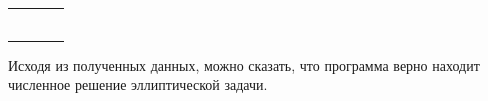 \begin{table}
\begin{tabularx}{1.0\textwidth}{| >{\raggedright\arraybackslash}X | >{\raggedright\arraybackslash}X | >{\raggedright\arraybackslash}X |>{\raggedright\arraybackslash}X |}
		\centering{($2.0; 2.0; z; 3.0$)} & \centering{1.60000000E+001}& \centering{0.00000000E+000} & \centering{0.00000000E+000} \tabularnewline \hline
		
		\centering{($x; 1.0; 1.0; 4.0$)} & \centering{1.00000000E+000}& \centering{0.00000000E+000} & \centering{0.00000000E+000} \tabularnewline 
		
		\centering{($x; 2.0; 2.0; 4.0$)} & \centering{1.60000000E+001}& \centering{0.00000000E+000} & \centering{0.00000000E+000} \tabularnewline 
		
		
		
		\centering{($1.0; y; 1.0; 4.0$)} & \centering{1.00000000E+000}& \centering{0.00000000E+000} & \centering{0.00000000E+000} \tabularnewline 
		
		\centering{($2.0; y; 2.0; 4.0$)} & \centering{1.60000000E+001}& \centering{0.00000000E+000} & \centering{0.00000000E+000} \tabularnewline 
		
		
		
		\centering{($1.0; 1.0; z; 4.0$)} & \centering{1.00000000E+000}& \centering{0.00000000E+000} & \centering{0.00000000E+000} \tabularnewline 
		
		\centering{($2.0; 2.0; z; 4.0$)} & \centering{1.60000000E+001}& \centering{0.00000000E+000} & \centering{0.00000000E+000} \tabularnewline \hline
		
	\end{tabularx}
	\label{tab:test10}
\end{table}

Исходя из полученных данных, можно сказать, что программа верно находит численное решение эллиптической задачи.